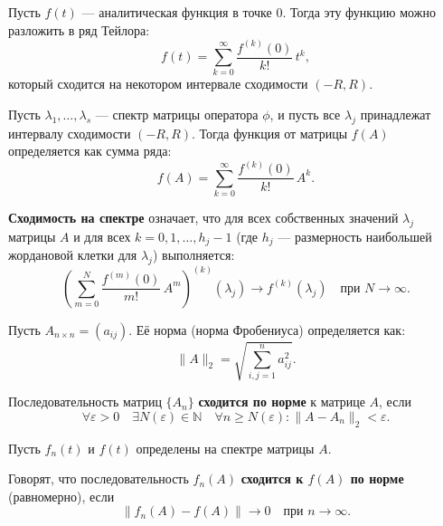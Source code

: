 \begin{shdef}
    \begin{definition}
    \leavevmode \nl 

    Пусть \( f(t) \) — аналитическая функция в точке \( 0 \). Тогда эту функцию можно \\разложить в ряд Тейлора:
    \[
    f(t) = \sum_{k=0}^{\infty} \frac{f^{(k)}(0)}{k!} \, t^k,
    \]
    который сходится на некотором интервале сходимости \( (-R, R) \).

    Пусть \( \lambda_1, \ldots, \lambda_s \) — спектр матрицы оператора \( \phi \), и пусть все \( \lambda_j \) принадлежат \\интервалу сходимости \( (-R, R) \). Тогда функция от матрицы \( f(A) \) определяется как сумма ряда:
    \[
    f(A) = \sum_{k=0}^{\infty} \frac{f^{(k)}(0)}{k!} \, A^k.
    \]

    \textbf{Сходимость на спектре} означает, что для всех собственных значений \( \lambda_j \) \\матрицы \( A \) и для всех \( k = 0, 1, \ldots, h_j - 1 \) (где \( h_j \) — размерность наибольшей жордановой клетки для \( \lambda_j \)) выполняется:
    \[
    \left( \sum_{m=0}^{N} \frac{f^{(m)}(0)}{m!} \, A^m \right)^{(k)}(\lambda_j) \to f^{(k)}(\lambda_j) \quad \text{при } N \to \infty.
    \]
    \end{definition}
\end{shdef}


\begin{shdef}
    \begin{definition}
    \leavevmode \nl 

    Пусть \( A_{n \times n} = (a_{ij}) \). Её норма (норма Фробениуса) определяется как:
    \[
    \|A\|_{2} = \sqrt{\sum_{i,j = 1}^{n} a_{ij}^2}.
    \]

    Последовательность матриц \( \{A_n\} \) \textbf{сходится по норме} к матрице \( A \), если
    \[
    \forall \varepsilon > 0 \quad \exists N(\varepsilon) \in \mathbb{N} \quad \forall n \geq N(\varepsilon) : \|A - A_n\|_{2} < \varepsilon.
    \]
    \end{definition}
\end{shdef}

\begin{shdef}
    \begin{definition}
    \leavevmode \nl 
    
    Пусть \( f_n(t) \) и \( f(t) \) определены на спектре матрицы \( A \). 
    
    Говорят, что последовательность \( f_n(A) \) \textbf{сходится к \( f(A) \) по норме} (равномерно), если
    \[
    \|f_n(A) - f(A)\| \to 0 \quad \text{при } n \to \infty.
    \]
    \end{definition}
\end{shdef}